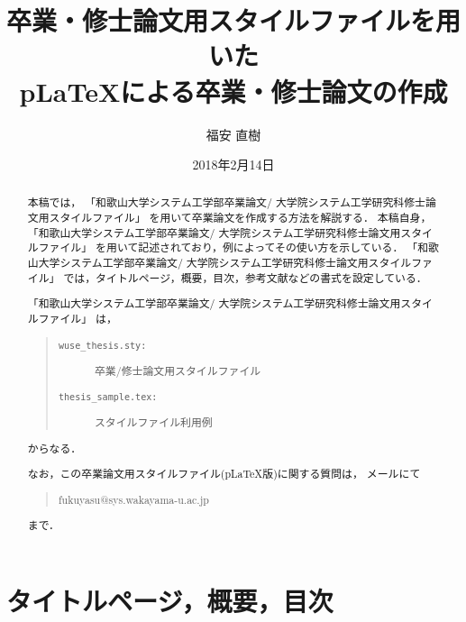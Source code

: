 \documentclass[11pt]{jreport}
\title{卒業・修士論文用スタイルファイルを用いた\\
       p\LaTeX による卒業・修士論文の作成}
\author{福安 直樹}
\date{2018年2月14日}	%
\begin{document}
\maketitle

\begin{abstract}
本稿では，
「和歌山大学システム工学部卒業論文/
  大学院システム工学研究科修士論文用スタイルファイル」
を用いて卒業論文を作成する方法を解説する．
本稿自身，
「和歌山大学システム工学部卒業論文/
  大学院システム工学研究科修士論文用スタイルファイル」
を用いて記述されており，例によってその使い方を示している．
「和歌山大学システム工学部卒業論文/
  大学院システム工学研究科修士論文用スタイルファイル」
では，タイトルページ，概要，目次，参考文献などの書式を設定している．

「和歌山大学システム工学部卒業論文/
  大学院システム工学研究科修士論文用スタイルファイル」
は，
\begin{quote}
  \begin{description}
    \item[\tt wuse\_thesis.sty:] 卒業/修士論文用スタイルファイル
    \item[\tt thesis\_sample.tex:] スタイルファイル利用例
  \end{description}
\end{quote}
からなる．

なお，この卒業論文用スタイルファイル(p\LaTeX 版)に関する質問は，
メールにて
\begin{quote}
fukuyasu@sys.wakayama-u.ac.jp
\end{quote}
まで．

\end{abstract}

\tableofcontents



\newpage
{}	%



\chapter{タイトルページ，概要，目次}
\end{document}
